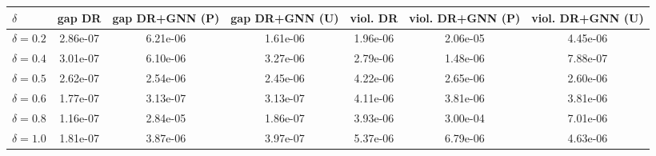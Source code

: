 
\begin{tabular}{lcccccc}
\toprule
$\delta$ & gap DR & gap DR+GNN (P) & gap DR+GNN (U) & viol. DR & viol. DR+GNN (P) & viol. DR+GNN (U) \\
\midrule
$\delta=0.2$ & 2.86e-07 & 6.21e-06 & 1.61e-06 & 1.96e-06 & 2.06e-05 & 4.45e-06 \\
$\delta=0.4$ & 3.01e-07 & 6.10e-06 & 3.27e-06 & 2.79e-06 & 1.48e-06 & 7.88e-07 \\
$\delta=0.5$ & 2.62e-07 & 2.54e-06 & 2.45e-06 & 4.22e-06 & 2.65e-06 & 2.60e-06 \\
$\delta=0.6$ & 1.77e-07 & 3.13e-07 & 3.13e-07 & 4.11e-06 & 3.81e-06 & 3.81e-06 \\
$\delta=0.8$ & 1.16e-07 & 2.84e-05 & 1.86e-07 & 3.93e-06 & 3.00e-04 & 7.01e-06 \\
$\delta=1.0$ & 1.81e-07 & 3.87e-06 & 3.97e-07 & 5.37e-06 & 6.79e-06 & 4.63e-06 \\
\bottomrule
\end{tabular}
